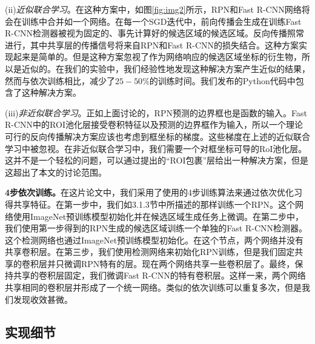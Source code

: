 \documentclass[../main.tex]{subfile}
\begin{document}
(ii)\textit{近似联合学习}。在这种方案中，如图\ref{fig:img2}所示，RPN和Fast R-CNN网络将会在训练中合并如一个网络。在每一个SGD迭代中，前向传播会生成在训练Fast R-CNN检测器被视为固定的、事先计算好的候选区域的候选区域。反向传播照常进行，其中共享层的传播信号将来自RPN和Fast R-CNN的损失结合。这种方案实现起来是简单的。但是这种方案忽视了作为网络响应的候选区域坐标的衍生物，所以是近似的。在我们的实验中，我们经验性地发现这种解决方案产生近似的结果，然而与依次训练相比，减少了$25-50\%$的训练时间。我们发布的Python代码中包含了这种解决方案。

(iii)\textit{非近似联合学习}。正如上面讨论的，RPN预测的边界框也是函数的输入。Fast R-CNN中的ROI池化层接受卷积特征以及预测的边界框作为输入，所以一个理论可行的反向传播解决方案应该也考虑到框坐标的梯度。这些梯度在上述的近似联合学习中被忽视。在非近似联合学习中，我们需要一个对框坐标可导的RoI池化层。这并不是一个轻松的问题，可以通过\cite{15}提出的“ROI包裹”层给出一种解决方案，但是这超出了本文的讨论范围。

\textbf{4步依次训练。}在这片论文中，我们采用了使用的4步训练算法来通过依次优化习得共享特征。在第一步中，我们如3.1.3节中所描述的那样训练一个RPN。这个网络使用ImageNet预训练模型初始化并在候选区域生成任务上微调。在第二步中，我们使用第一步得到的RPN生成的候选区域训练一个单独的Fast R-CNN检测器。这个检测网络也通过ImageNet预训练模型初始化。在这个节点，两个网络并没有共享卷积层。在第三步，我们使用检测网络来初始化RPN训练，但是我们固定共享的卷积层并只微调RPN特有的层。现在两个网络共享一些卷积层了。最终，保持共享的卷积层固定，我们微调Fast R-CNN的特有卷积层。这样一来，两个网络共享相同的卷积层并形成了一个统一网络。类似的依次训练可以重复多次，但是我们发现收效甚微。

\subsection{实现细节}
\end{document}
